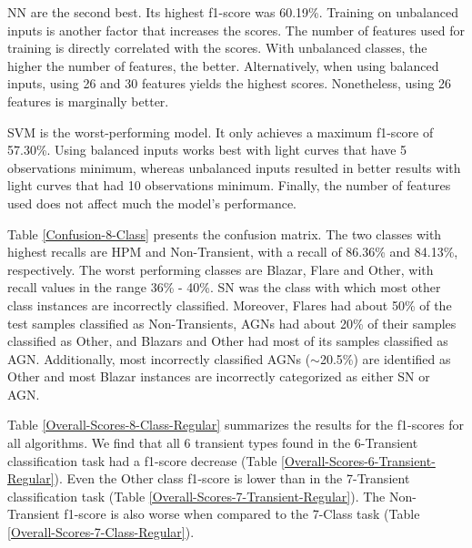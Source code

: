 \documentclass[a4paper,fleqn,usenatbib]{mnras}
\begin{document}
NN are the second best. 
Its highest f1-score was 60.19\%. 
Training on unbalanced inputs is another factor that increases the
scores. 
The number of features used for training is directly correlated with
the scores.
With unbalanced classes, the higher the number of features, the
better. 
Alternatively, when using balanced inputs, using 26 and 30 features
yields the highest scores. 
Nonetheless, using 26 features is marginally better. 

SVM is the worst-performing model.
It only achieves a maximum f1-score of 57.30\%.
Using balanced inputs works best with light curves that have 5 
observations minimum, whereas unbalanced inputs
resulted in better results with light curves that had 10 observations
minimum.  
Finally, the number of features used does not affect much the model's
performance.%

Table \ref{Confusion-8-Class} presents the confusion matrix.
The two classes with highest recalls are HPM and Non-Transient, with a
recall of 86.36\% and 84.13\%, respectively. 
The worst performing classes are Blazar, Flare and Other, with recall
values in the range 36\% - 40\%. 
SN was the class with which most other class instances are
incorrectly classified. 
Moreover, Flares had about 50\% of the test samples classified as
Non-Transients, AGNs had about 20\% of their 
samples classified as Other, and Blazars and Other had most of  its
samples classified as AGN. 
Additionally, most incorrectly classified AGNs ($\sim$20.5\%) are
identified as Other and most Blazar instances are
incorrectly categorized as either SN or AGN. 

Table \ref{Overall-Scores-8-Class-Regular} summarizes the results
for the f1-scores for all algorithms. 
We find that all 6 transient types found in the
6-Transient classification task had a f1-score decrease (Table
\ref{Overall-Scores-6-Transient-Regular}). 
Even the Other class f1-score is lower than in the 7-Transient classification task (Table
\ref{Overall-Scores-7-Transient-Regular}).
The Non-Transient f1-score is also worse when compared to the 7-Class
task (Table \ref{Overall-Scores-7-Class-Regular}).  
\end{document}
